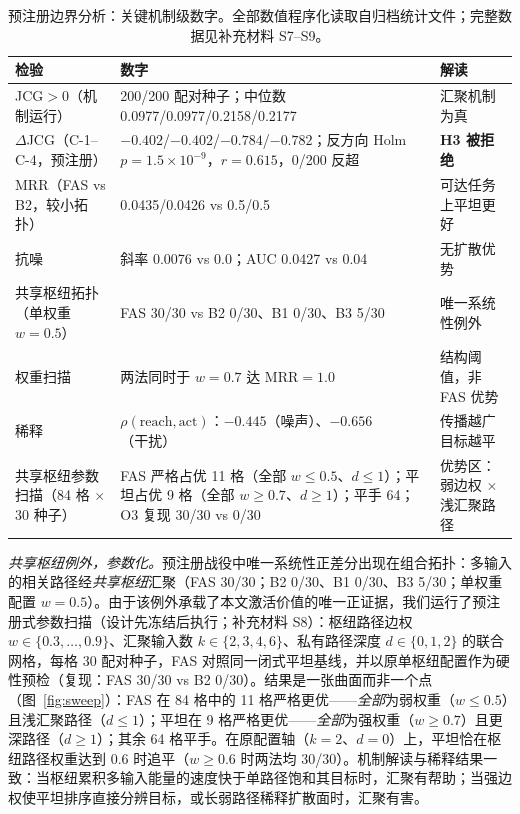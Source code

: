 \documentclass[10pt,a4paper]{ctexart}
\begin{document}
\begin{table}[t]
\centering\small
\caption{预注册边界分析：关键机制级数字。全部数值程序化读取自归档统计文件；完整数据见补充材料 S7--S9。}
\label{tab:boundary}
\begin{tabular}{L{4.4cm}L{6.6cm}L{3.4cm}}
\toprule
\textbf{检验} & \textbf{数字} & \textbf{解读} \\
\midrule
JCG${>}0$（机制运行） & 200/200 配对种子；中位数 0.0977/0.0977/0.2158/0.2177 & 汇聚机制为真 \\
$\Delta$JCG（C-1--C-4，预注册） & ${-}0.402$/${-}0.402$/${-}0.784$/${-}0.782$；反方向 Holm $p{=}1.5\times10^{-9}$，$r{=}0.615$，0/200 反超 & \textbf{H3 被拒绝} \\
MRR（FAS vs B2，较小拓扑） & 0.0435/0.0426 vs 0.5/0.5 & 可达任务上平坦更好 \\
抗噪 & 斜率 0.0076 vs 0.0；AUC 0.0427 vs 0.04 & 无扩散优势 \\
共享枢纽拓扑（单权重 $w{=}0.5$） & FAS 30/30 vs B2 0/30、B1 0/30、B3 5/30 & 唯一系统性例外 \\
权重扫描 & 两法同时于 $w{=}0.7$ 达 MRR${=}1.0$ & 结构阈值，非 FAS 优势 \\
稀释 & $\rho(\mathrm{reach},\mathrm{act})$：$-0.445$（噪声）、$-0.656$（干扰） & 传播越广目标越平 \\
共享枢纽参数扫描（84 格 $\times$ 30 种子） & FAS 严格占优 11 格（全部 $w{\le}0.5$、$d{\le}1$）；平坦占优 9 格（全部 $w{\ge}0.7$、$d{\ge}1$）；平手 64；O3 复现 30/30 vs 0/30 & 优势区：弱边权 $\times$ 浅汇聚路径 \\
\bottomrule
\end{tabular}
\end{table}

\emph{共享枢纽例外，参数化。}预注册战役中唯一系统性正差分出现在组合拓扑：多输入的相关路径经\emph{共享枢纽}汇聚（FAS 30/30；B2 0/30、B1 0/30、B3 5/30；单权重配置 $w{=}0.5$）。由于该例外承载了本文激活价值的唯一正证据，我们运行了预注册式参数扫描（设计先冻结后执行；补充材料 S8）：枢纽路径边权 $w\in\{0.3,\ldots,0.9\}$、汇聚输入数 $k\in\{2,3,4,6\}$、私有路径深度 $d\in\{0,1,2\}$ 的联合网格，每格 30 配对种子，FAS 对照同一闭式平坦基线，并以原单枢纽配置作为硬性预检（复现：FAS 30/30 vs B2 0/30）。结果是一张曲面而非一个点（图~\ref{fig:sweep}）：FAS 在 84 格中的 11 格严格更优——\emph{全部}为弱权重（$w{\le}0.5$）且浅汇聚路径（$d{\le}1$）；平坦在 9 格严格更优——\emph{全部}为强权重（$w{\ge}0.7$）且更深路径（$d{\ge}1$）；其余 64 格平手。在原配置轴（$k{=}2$、$d{=}0$）上，平坦恰在枢纽路径权重达到 0.6 时追平（$w{\ge}0.6$ 时两法均 30/30）。机制解读与稀释结果一致：当枢纽累积多输入能量的速度快于单路径饱和其目标时，汇聚有帮助；当强边权使平坦排序直接分辨目标，或长弱路径稀释扩散面时，汇聚有害。
\end{document}
